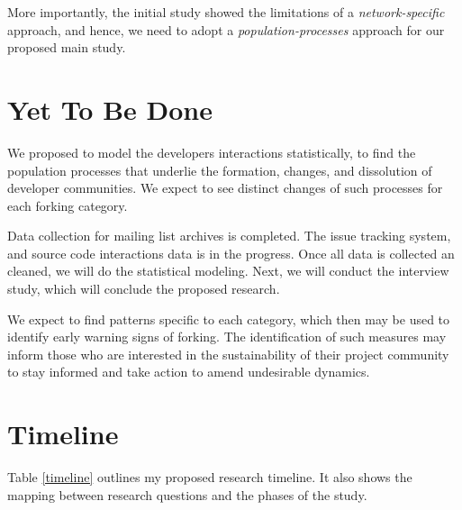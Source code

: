 \documentclass{report}
\begin{document}
More importantly, the initial study showed the limitations of a \textit{network-specific} approach, and hence, we need to adopt a \textit{population-processes} approach for our proposed main study.

\section{Yet To Be Done}
\label{YetToBeDone}

We proposed to model the developers interactions statistically, to find the population processes that underlie the formation, changes, and dissolution of developer communities. We expect to see distinct changes of such processes for each forking category.

Data collection for mailing list archives is completed. The issue tracking system, and source code interactions data is in the progress. Once all data is collected an cleaned, we will do the statistical modeling. Next, we will conduct the interview study, which will conclude the proposed research. 

We expect to find patterns specific to each category, which then may be used to identify early warning signs of forking. The identification of such measures may inform those who are interested in the sustainability of their project community to stay informed and take action to amend undesirable dynamics. 

\section{Timeline}
\label{timelineSection}

Table \ref{timeline} outlines my proposed research timeline. It also shows the mapping between research questions and the phases of the study.
\end{document}
